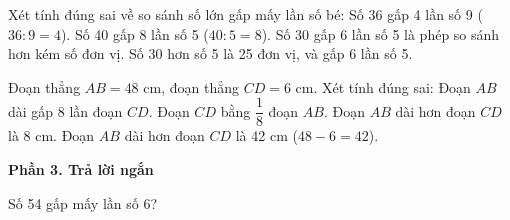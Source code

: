 \begin{ex} %
Xét tính đúng sai về so sánh số lớn gấp mấy lần số bé:
\choiceTF
{\True Số 36 gấp 4 lần số 9 ($36 : 9 = 4$).}
{\True Số 40 gấp 8 lần số 5 ($40 : 5 = 8$).}
{Số 30 gấp 6 lần số 5 là phép so sánh hơn kém số đơn vị.}
{\True Số 30 hơn số 5 là 25 đơn vị, và gấp 6 lần số 5.}
\end{ex}

\begin{ex} %
Đoạn thẳng $AB = 48\text{ cm}$, đoạn thẳng $CD = 6\text{ cm}$. Xét tính đúng sai:
\choiceTF
{\True Đoạn $AB$ dài gấp 8 lần đoạn $CD$.}
{\True Đoạn $CD$ bằng $\dfrac{1}{8}$ đoạn $AB$.}
{Đoạn $AB$ dài hơn đoạn $CD$ là 8 cm.}
{\True Đoạn $AB$ dài hơn đoạn $CD$ là 42 cm ($48 - 6 = 42$).}
\end{ex}

\textbf{Phần 3. Trả lời ngắn}

\begin{ex} %
Số 54 gấp mấy lần số 6?
\end{ex}

